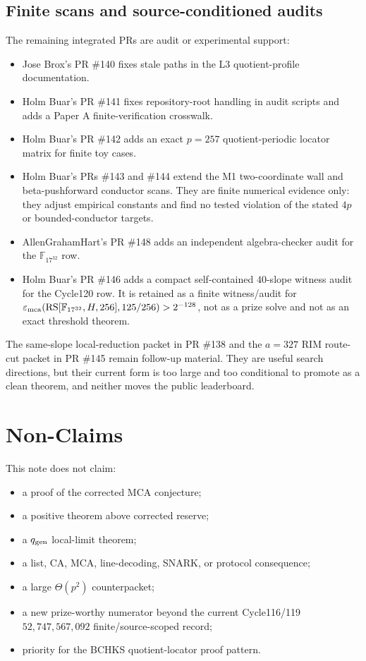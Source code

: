 \documentclass[11pt]{article}
\newcommand{\F}{\mathbb F}
\newcommand{\RS}{\operatorname{RS}}
\newcommand{\qgen}{q_{\rm gen}}
\begin{document}
\subsection{Finite scans and source-conditioned audits}

The remaining integrated PRs are audit or experimental support:
\begin{itemize}
\item Jose Brox's PR \#140 fixes stale paths in the L3 quotient-profile
  documentation.
\item Holm Buar's PR \#141 fixes repository-root handling in audit scripts and
  adds a Paper A finite-verification crosswalk.
\item Holm Buar's PR \#142 adds an exact \(p=257\) quotient-periodic locator
  matrix for finite toy cases.
\item Holm Buar's PRs \#143 and \#144 extend the M1 two-coordinate wall and
  beta-pushforward conductor scans.  They are finite numerical evidence only:
  they adjust empirical constants and find no tested violation of the stated
  \(4p\) or bounded-conductor targets.
\item AllenGrahamHart's PR \#148 adds an independent algebra-checker audit for
  the \(\F_{17^{32}}\) row.
\item Holm Buar's PR \#146 adds a compact self-contained \(40\)-slope witness
  audit for the Cycle120 row.  It is retained as a finite witness/audit for
  \(\varepsilon_{\rm mca}(\RS[\F_{17^{32}},H,256],125/256)>2^{-128}\), not as a
  prize solve and not as an exact threshold theorem.
\end{itemize}

The same-slope local-reduction packet in PR \#138 and the \(a=327\) RIM
route-cut packet in PR \#145 remain follow-up material.  They are useful search
directions, but their current form is too large and too conditional to promote
as a clean theorem, and neither moves the public leaderboard.

\section{Non-Claims}
\label{sec:nonclaims}

This note does not claim:
\begin{itemize}
\item a proof of the corrected MCA conjecture;
\item a positive theorem above corrected reserve;
\item a \(\qgen\) local-limit theorem;
\item a list, CA, MCA, line-decoding, SNARK, or protocol consequence;
\item a large \(\Theta(p^2)\) counterpacket;
\item a new prize-worthy numerator beyond the current Cycle116/119
  \(52{,}747{,}567{,}092\) finite/source-scoped record;
\item priority for the BCHKS quotient-locator proof pattern.
\end{itemize}
\end{document}
